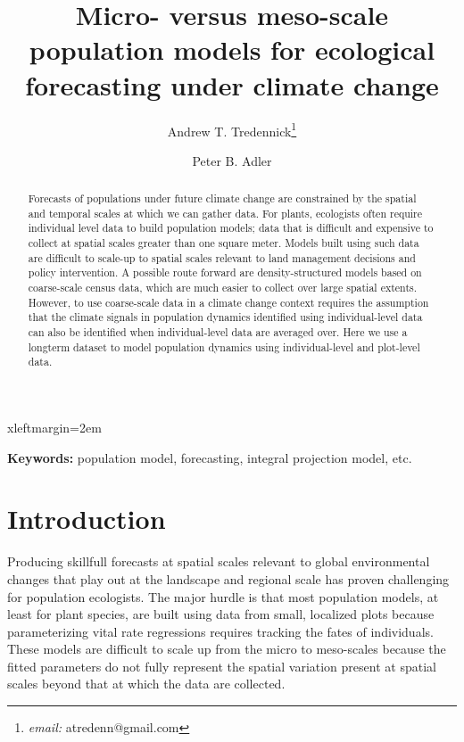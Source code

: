 \documentclass[12pt]{article}
\begin{document}



 {xleftmargin=2em}

\title{\LARGE Micro- versus meso-scale population models for ecological forecasting under climate change}
\author[]{\large Andrew T. Tredennick\footnote{\emph{email:} atredenn@gmail.com}}
\author[]{\large Peter B. Adler}
\maketitle

\begin{abstract}
\noindent Forecasts of populations under future climate change are constrained by the spatial and temporal scales at which we can gather data. For plants, ecologists often require individual level data to build population models; data that is difficult and expensive to collect at spatial scales greater than one square meter. Models built using such data are difficult to scale-up to spatial scales relevant to land management decisions and policy intervention. A possible route forward are density-structured models based on coarse-scale census data, which are much easier to collect over large spatial extents. However, to use coarse-scale data in a climate change context requires the assumption that the climate signals in population dynamics identified using individual-level data can also be identified when individual-level data are averaged over. Here we use a longterm dataset to model population dynamics using individual-level and plot-level data.   
\end{abstract}

\noindent{}\textbf{Keywords:} population model, forecasting, integral projection model, etc.

\section{Introduction}
Producing skillfull forecasts at spatial scales relevant to global environmental changes that play out at the landscape and regional scale has proven challenging for population ecologists. The major hurdle is that most population models, at least for plant species, are built using data from small, localized plots because parameterizing vital rate regressions requires tracking the fates of individuals. These models are difficult to scale up from the micro to meso-scales because the fitted parameters do not fully represent the spatial variation present at spatial scales beyond that at which the data are collected. 
\end{document}
